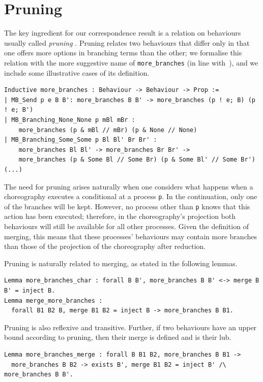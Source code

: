 \documentclass[runningheads]{llncs}
\begin{document}
\section{Pruning}
\label{sec:pruning}

The key ingredient for our correspondence result is a relation on behaviours usually called \emph{pruning} \cite{CHY12,CM13}.
Pruning relates two behaviours that differ only in that one offers more options in branching terms
than the other; we formalise this relation with the more suggestive name of
\lstinline+more_branches+ (in line with~\cite{M21itc}), and we include some illustrative cases of its definition.
\begin{lstlisting}
Inductive more_branches : Behaviour -> Behaviour -> Prop :=
| MB_Send p e B B': more_branches B B' -> more_branches (p ! e; B) (p ! e; B')
| MB_Branching_None_None p mBl mBr :
    more_branches (p & mBl // mBr) (p & None // None)
| MB_Branching_Some_Some p Bl Bl' Br Br' :
    more_branches Bl Bl' -> more_branches Br Br' ->
    more_branches (p & Some Bl // Some Br) (p & Some Bl' // Some Br')           (...)
\end{lstlisting}
The need for pruning arises naturally when one considers what happens when a choreography executes a
conditional at a process \lstinline+p+.
In the continuation, only one of the branches will be kept.
However, no process other than \lstinline+p+ knows that this action has been executed; therefore, in the
choreography's projection both behaviours will still be available for all other processes.
Given the definition of merging, this means that these processes' behaviours may contain more
branches than those of the projection of the choreography after reduction.

Pruning is naturally related to merging, as stated in the following lemmas.
\begin{lstlisting}
Lemma more_branches_char : forall B B', more_branches B B' <-> merge B B' = inject B.
Lemma merge_more_branches :
  forall B1 B2 B, merge B1 B2 = inject B -> more_branches B B1.
\end{lstlisting}

Pruning is also reflexive and transitive.
Further, if two behaviours have an upper bound according to pruning, then their merge is defined and is their lub.
\begin{lstlisting}
Lemma more_branches_merge : forall B B1 B2, more_branches B B1 ->
  more_branches B B2 -> exists B', merge B1 B2 = inject B' /\ more_branches B B'.
\end{lstlisting}
\end{document}
